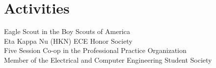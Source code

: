 \documentclass[letterpaper]{deedy-resume} %
\begin{document}
\begin{minipage}[t]{0.33\textwidth}
\sectionspace %


\section{Activities} 
\textbullet{} Eagle Scout in the Boy Scouts of America \\ 
\textbullet{} Eta Kappa Nu (HKN) ECE Honor Society  \\
\textbullet{} Five Session Co-op in the Professional Practice Organization \\
\textbullet{} Member of the Electrical and Computer Engineering Student Society

\sectionspace %


\end{minipage} %
\hfill
%
%
\end{document}
